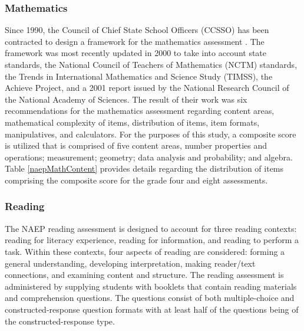 \documentclass[letterpaper,12p,twoside]{article} %
\begin{document}
\subsubsection{Mathematics}

Since 1990, the Council of Chief State School Officers (CCSSO) has been contracted to design a framework for the mathematics assessment \cite{naepmath}. The framework was most recently updated in 2000 to take into account state standards, the National Council of Teachers of Mathematics (NCTM) standards, the Trends in International Mathematics and Science Study (TIMSS), the Achieve Project, and a 2001 report issued by the National Research Council of the National Academy of Sciences. The result of their work was six recommendations for the mathematics assessment regarding content areas, mathematical complexity of items, distribution of items, item formats, manipulatives, and calculators. For the purposes of this study, a composite score is utilized that is comprised of five content areas, number properties and operations; measurement; geometry; data analysis and probability; and algebra. Table \ref{naepMathContent} provides details regarding the distribution of items comprising the composite score for the grade four and eight assessments.



\subsubsection{Reading}

The NAEP reading assessment \cite{naepreading} is designed to account for three reading contexts: reading for literacy experience, reading for information, and reading to perform a task. Within these contexts, four aspects of reading are considered: forming a general understanding, developing interpretation, making reader/text connections, and examining content and structure. The reading assessment is administered by supplying students with booklets that contain reading materials and comprehension questions. The questions consist of both multiple-choice and constructed-response question formats with at least half of the questions being of the constructed-response type. 
\end{document}
